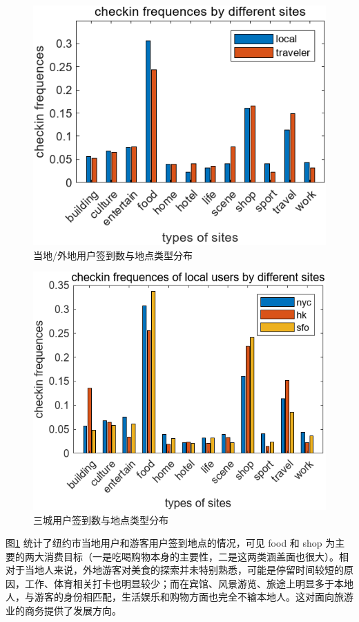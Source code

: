 \documentclass[UTF8]{ctexart}
\begin{document}
		\begin{figure}[h]
			\centering
			\includegraphics{checkin_sitetype_l&t.png}
			\caption{当地/外地用户签到数与地点类型分布}
			\label{ven_c_lt}
		\end{figure}
		\begin{figure}[h]
			\centering
			\includegraphics{checkin_sitetype_l_nhs.png}
			\caption{三城用户签到数与地点类型分布}
			\label{ven_c_nhs}
		\end{figure}
		
		图\ref{ven_c_lt} 统计了纽约市当地用户和游客用户签到地点的情况，可见 food 和 shop 为主要的两大消费目标（一是吃喝购物本身的主要性，二是这两类涵盖面也很大）。相对于当地人来说，外地游客对美食的探索并未特别熟悉，可能是停留时间较短的原因，工作、体育相关打卡也明显较少；而在宾馆、风景游览、旅途上明显多于本地人，与游客的身份相匹配，生活娱乐和购物方面也完全不输本地人。这对面向旅游业的商务提供了发展方向。
		
\end{document}
